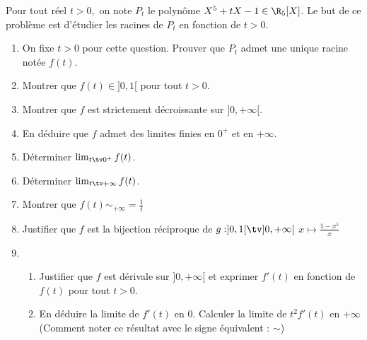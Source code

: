 \documentclass[a4paper, 11pt,reqno]{article}
\begin{document}
\begin{exercice}
Pour tout réel $t>0, $ on note $P_t$ le polynôme $X^5 +tX-1 \in \R_5[X]$. Le but de ce problème est d'étudier les racines de $P_t$ en fonction de $t>0$. 
\begin{enumerate}
\item On fixe $t>0$ pour cette question. Prouver que $P_t$ admet une unique racine notée $f(t)$. 
\item Montrer que $f(t) \in ]0,1[$ pour tout $t>0.$
\item Montrer que $f$ est strictement décroissante sur $]0,+\infty[$.
\item En déduire que $f$ admet des limites finies en $0^+$ et en $+\infty$.

\item Déterminer $\lim_{t\tv 0^+} f(t)$. 

\item Déterminer $\lim_{t\tv+\infty} f(t)$. 
\item Montrer que $f(t)\sim_{+\infty}= \frac{1}{t}$

\item Justifier que $f$ est la bijection réciproque de $g : ]0,1[\tv ]0,+\infty[$ 
$x \mapsto\frac{1-x^5}{x}$
\item \begin{enumerate}
\item Justifier que $f$ est dérivale sur $]0,+\infty[ $ et exprimer $f'(t)$ en fonction de $f(t)$ pour tout $t>0$.
\item En déduire la limite de $f'(t)$ en $0$. Calculer la limite de $t^2 f'(t)$ en $+\infty$ (Comment noter ce résultat avec le signe équivalent : $\sim$) 
\end{enumerate}
\end{enumerate}
\end{exercice}
\end{document}

